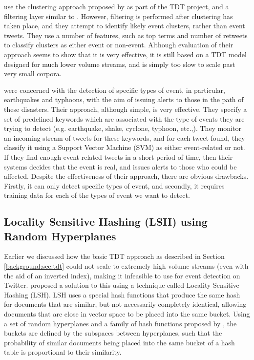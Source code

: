 \cite{becker2011beyond} use the clustering approach proposed by \cite{Yang98} as part of the TDT project, and a filtering layer similar to \cite{sankaranarayanan2009twitterstand}.
However, filtering is performed after clustering has taken place, and they attempt to identify likely event clusters, rather than event tweets.
They use a number of features, such as top terms and number of retweets to classify clusters as either event or non-event.
Although evaluation of their approach seems to show that it is very effective, it is still based on a TDT model designed for much lower volume streams, and is simply too slow to scale past very small corpora.

\cite{Sakaki:2010:EST:1772690.1772777} were concerned with the detection of specific types of event, in particular, earthquakes and typhoons, with the aim of issuing alerts to those in the path of these disasters.
Their approach, although simple, is very effective.
They specify a set of predefined keywords which are associated with the type of events they are trying to detect (e.g. earthquake, shake, cyclone, typhoon, etc.,).
They monitor an incoming stream of tweets for these keywords, and for each tweet found, they classify it using a Support Vector Machine (SVM) as either event-related or not.
If they find enough event-related tweets in a short period of time, then their systems decides that the event is real, and issues alerts to those who could be affected.
Despite the effectiveness of their approach, there are obvious drawbacks. Firstly, it can only detect specific types of event, and secondly, it requires training data for each of the types of event we want to detect.

\subsection{Locality Sensitive Hashing (LSH) using Random Hyperplanes}
\label{background:sec:lsh}
Earlier we discussed how the basic TDT approach as described in Section \ref{background:sec:tdt} could not scale to extremely high volume streams (even with the aid of an inverted index), making it infeasible to use for event detection on Twitter.
\cite{Petrovic:2010:SFS:1857999.1858020} proposed a solution to this using a technique called Locality Sensitive Hashing (LSH).
LSH uses a special hash functions that produce the same hash for documents that are similar, but not necessarily completely identical, allowing documents that are close in vector space to be placed into the same bucket.
Using a set of random hyperplanes and a family of hash functions proposed by \cite{Charikar2002}, the buckets are defined by the subspaces between hyperplanes, such that the probability of similar documents being placed into the same bucket of a hash table is proportional to their similarity.

